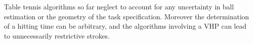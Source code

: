 \documentclass[letterpaper, 10 pt, conference]{ieeeconf}
\begin{document}
Table tennis algorithms so far neglect to account for any uncertainty in ball estimation or the geometry of the task specification. 
Moreover the determination of a hitting time can be arbitrary, and the algorithms involving a VHP can lead to unnecessarily restrictive strokes. 





\end{document}
